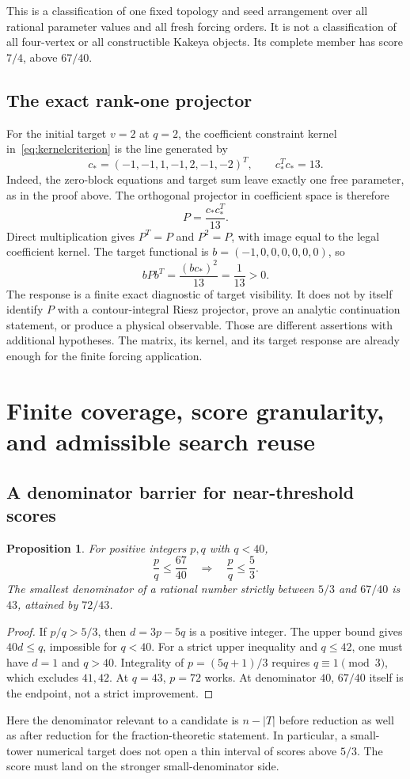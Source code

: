 \documentclass[11pt,letterpaper]{article}
\newtheorem{proposition}[theorem]{Proposition}
\theoremstyle{definition}
\theoremstyle{remark}\newtheorem{remark}[theorem]{Remark}
\begin{document}
This is a classification of one fixed topology and seed arrangement over all rational parameter values and all fresh forcing orders. It is not a classification of all four-vertex or all constructible Kakeya objects. Its complete member has score $7/4$, above $67/40$.

\subsection{The exact rank-one projector}
For the initial target $v=2$ at $q=2$, the coefficient constraint kernel in~\eqref{eq:kernelcriterion} is the line generated by
\[
c_*=(-1,-1,1,-1,2,-1,-2)^T,\qquad c_*^Tc_*=13.
\]
Indeed, the zero-block equations and target sum leave exactly one free parameter, as in the proof above. The orthogonal projector in coefficient space is therefore
\begin{equation}\label{eq:projector}
P=\frac{c_*c_*^T}{13}.
\end{equation}
Direct multiplication gives $P^T=P$ and $P^2=P$, with image equal to the legal coefficient kernel. The target functional is $b=(-1,0,0,0,0,0,0)$, so
\begin{equation}\label{eq:response}
bPb^T=\frac{(bc_*)^2}{13}=\frac1{13}>0.
\end{equation}
The response is a finite exact diagnostic of target visibility. It does not by itself identify $P$ with a contour-integral Riesz projector, prove an analytic continuation statement, or produce a physical observable. Those are different assertions with additional hypotheses. The matrix, its kernel, and its target response are already enough for the finite forcing application.

\section{Finite coverage, score granularity, and admissible search reuse}
\subsection{A denominator barrier for near-threshold scores}
\begin{proposition}\label{prop:granularity}
For positive integers $p,q$ with $q<40$,
\[
\frac pq\leq\frac{67}{40}\quad\Longrightarrow\quad\frac pq\leq\frac53.
\]
The smallest denominator of a rational number strictly between $5/3$ and $67/40$ is $43$, attained by $72/43$.
\end{proposition}
\begin{proof}
If $p/q>5/3$, then $d=3p-5q$ is a positive integer. The upper bound gives $40d\leq q$, impossible for $q<40$. For a strict upper inequality and $q\leq42$, one must have $d=1$ and $q>40$. Integrality of $p=(5q+1)/3$ requires $q\equiv1\pmod3$, which excludes $41,42$. At $q=43$, $p=72$ works. At denominator $40$, $67/40$ itself is the endpoint, not a strict improvement.
\end{proof}
Here the denominator relevant to a candidate is $n-|T|$ before reduction as well as after reduction for the fraction-theoretic statement. In particular, a small-tower numerical target does not open a thin interval of scores above $5/3$. The score must land on the stronger small-denominator side.
\end{document}
